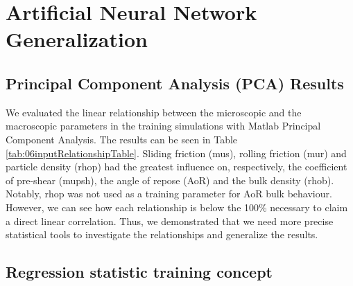 
\chapter{Artificial Neural Network Generalization}
\label{cap:anntraining}

\section{Principal Component Analysis (PCA) Results}
\label{sec:pcaanalysis}

We evaluated the linear relationship between the microscopic and the
macroscopic parameters in the training simulations with Matlab Principal
Component Analysis.
The results can be seen in Table \ref{tab:06inputRelationshipTable}.
Sliding friction (\acs{mus}), rolling friction (\acs{mur}) and particle density (\acs{rhop})
had the greatest influence on, respectively, the coefficient of pre-shear
(\acs{mupsh}), the angle of repose  (\acs{AoR}) and the bulk density (\acs{rhob}). Notably, \acs{rhop}
was not used as a training parameter for \acs{AoR} bulk behaviour. \\
However, we can see how each relationship is below the 100\% necessary to claim
a direct linear correlation.
Thus, we demonstrated that we need more precise statistical tools to investigate
the relationships and generalize the results.



\section{Regression statistic training concept}
\label{sec:regressiontrainingconcept}



